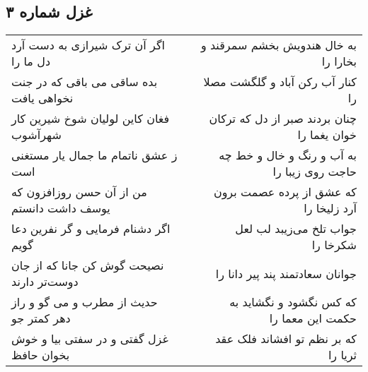 \begin{center}
\section*{غزل شماره ۳}
\label{sec:sh003}
\begin{longtable}{l p{0.5cm} r}
اگر آن ترک شیرازی به دست آرد دل ما را
&&
به خال هندویش بخشم سمرقند و بخارا را
\\
بده ساقی می باقی که در جنت نخواهی یافت
&&
کنار آب رکن آباد و گلگشت مصلا را
\\
فغان کاین لولیان شوخ شیرین کار شهرآشوب
&&
چنان بردند صبر از دل که ترکان خوان یغما را
\\
ز عشق ناتمام ما جمال یار مستغنی است
&&
به آب و رنگ و خال و خط چه حاجت روی زیبا را
\\
من از آن حسن روزافزون که یوسف داشت دانستم
&&
که عشق از پرده عصمت برون آرد زلیخا را
\\
اگر دشنام فرمایی و گر نفرین دعا گویم
&&
جواب تلخ می‌زیبد لب لعل شکرخا را
\\
نصیحت گوش کن جانا که از جان دوست‌تر دارند
&&
جوانان سعادتمند پند پیر دانا را
\\
حدیث از مطرب و می گو و راز دهر کمتر جو
&&
که کس نگشود و نگشاید به حکمت این معما را
\\
غزل گفتی و در سفتی بیا و خوش بخوان حافظ
&&
که بر نظم تو افشاند فلک عقد ثریا را
\\
\end{longtable}
\end{center}
